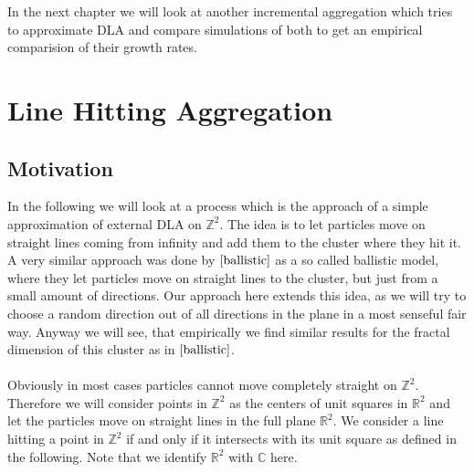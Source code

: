 \documentclass[12pt,a4paper]{scrartcl}
\numberwithin{equation}{subsection}
\newcommand{\C}{\mathbb{C}} %
\newcommand{\R}{\mathbb{R}} %
\newcommand{\1}{\mathbbm{1}}
\numberwithin{equation}{section}
\theoremstyle{definition}
\begin{document}
In the next chapter we will look at another incremental aggregation which tries to approximate DLA and compare simulations of both to get an empirical comparision of their growth rates. 
















\newpage
\section{Line Hitting Aggregation} \label{lha}

\subsection{Motivation}

In the following we will look at a process which is the approach of a simple approximation of external DLA on $\mathbb{Z}^2$. The idea is to let particles move on straight lines coming from infinity and add them to the cluster where they hit it. A very similar approach was done by $\cite{ballistic}$ as a so called ballistic model, where they let particles move on straight lines to the cluster, but just from a small amount of directions. Our approach here extends this idea, as we will try to choose a random direction out of all directions in the plane in a most senseful fair way. Anyway we will see, that empirically we find similar results for the fractal dimension of this cluster as in $\cite{ballistic}$. \\
\\Obviously in most cases particles cannot move completely straight on $\mathbb{Z}^2$. Therefore we will consider points in $\mathbb{Z}^2$ as the centers of unit squares in $\R^2$ and let the particles move on straight lines in the full plane $\mathbb{R}^2$. We consider a line hitting a point in $\mathbb{Z}^2$ if and only if it intersects with its unit square as defined in the following. Note that we identify $\R^2$ with $\C$ here. 
\end{document}
